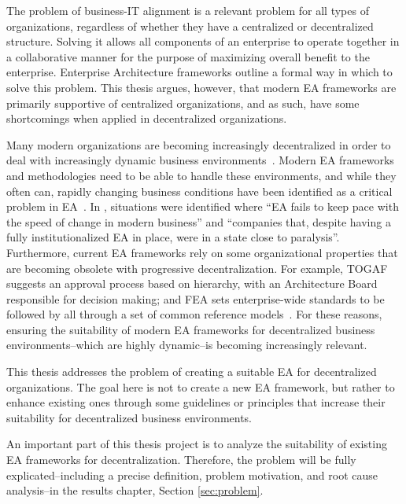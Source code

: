 The problem of business-IT alignment is a relevant problem for all types of organizations, regardless of whether they have a centralized or decentralized structure. Solving it allows all components of an enterprise to operate together in a collaborative manner for the purpose of maximizing overall benefit to the enterprise. Enterprise Architecture frameworks outline a formal way in which to solve this problem. This thesis argues, however, that modern EA frameworks are primarily supportive of centralized organizations, and as such, have some shortcomings when applied in decentralized organizations. 

Many modern organizations are becoming increasingly decentralized in order to deal with increasingly dynamic business environments~\cite{fulk1995}. Modern EA frameworks and methodologies need to be able to handle these environments, and while they often can, rapidly changing business conditions have been identified as a critical problem in EA~\cite{kaisler2005ea,lucke2010critical}. In \cite[Ch. 1]{Bente2012}, situations were identified where ``EA fails to keep pace with the speed of change in modern business'' and ``companies that, despite having a fully institutionalized EA in place, were in a state close to paralysis''. Furthermore, current EA frameworks rely on some organizational properties that are becoming obsolete with progressive decentralization. For example, TOGAF~\cite[Ch. 47]{togaf9.1} suggests an approval process based on hierarchy, with an Architecture Board responsible for decision making; and FEA sets enterprise-wide standards to be followed by all through a set of common reference models~\cite{sessions2007}. For these reasons, ensuring the suitability of modern EA frameworks for  decentralized business environments--which are highly dynamic--is becoming increasingly relevant. 

This thesis addresses the problem of creating a suitable EA for decentralized organizations. The goal here is not to create a new EA framework, but rather to enhance existing ones through some guidelines or principles that increase their suitability for decentralized business environments.

An important part of this thesis project is to analyze the suitability of existing EA frameworks for decentralization. Therefore, the problem will be fully explicated--including a precise definition, problem motivation, and root cause analysis--in the results chapter, Section \ref{sec:problem}.

